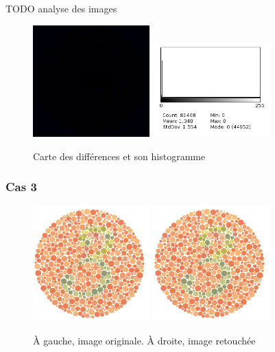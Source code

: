 \documentclass[a4paper]{article}
\begin{document}
TODO analyse des images

\begin{figure}[H]
\begin{center}
\includegraphics[width=170px]{../resultats/e1_q2_k2_diff.png}
\includegraphics[width=170px]{../resultats/e1_q2_k2_diff_hist.png}
\end{center}
\caption{Carte des différences et son histogramme}
\end{figure}

\clearpage
\subsubsection{Cas 3}

\begin{figure}[H]
\begin{center}
\includegraphics[width=170px]{../base/cas_3_dalton3.png}
\includegraphics[width=170px]{../resultats/e1_q2_k3_luminance.png}
\end{center}
\caption{À gauche, image originale. À droite, image retouchée}
\end{figure}
\end{document}
